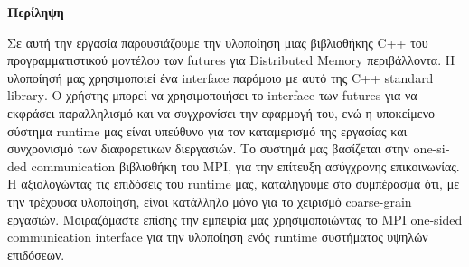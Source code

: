 \thispagestyle{empty}


\begin{titlepage}
\begin{center}

{\bf\Large{Περίληψη}}\\

\end{center}

Σε αυτή την εργασία παρουσιάζουμε την υλοποίηση μιας βιβλιοθήκης \textlatin{C++} του προγραμματιστικού μοντέλου
των futures για \textlatin{Distributed Memory} περιβάλλοντα. Η υλοποίησή μας χρησιμοποιεί ένα interface παρόμοιο 
με αυτό της \textlatin{C++ standard library}. Ο χρήστης μπορεί να χρησιμοποιήσει το
\textlatin{interface} των \textlatin{futures} για να εκφράσει παραλληλισμό και να συγχρονίσει την εφαρμογή του, ενώ η
υποκείμενο σύστημα \textlatin{runtime} μας είναι υπεύθυνο για τον καταμερισμό της εργασίας και συνχρονισμό των 
διαφορετικων διεργασιών. Το συστημά μας βασίζεται στην \textlatin{one-sided communication} βιβλιοθήκη του \textlatin{MPI},
για την επίτευξη ασύγχρονης επικοινωνίας. Η αξιολογώντας τις επιδόσεις του \textlatin{runtime} μας, καταλήγουμε 
στο συμπέρασμα ότι, με την τρέχουσα υλοποίηση, είναι κατάλληλο μόνο για το χειρισμό \textlatin{coarse-grain} εργασιών.
Μοιραζόμαστε επίσης την εμπειρία μας χρησιμοποιώντας το \textlatin{MPI one-sided communication interface} για την υλοποίηση 
ενός \textlatin{runtime} συστήματος υψηλών επιδόσεων.

\vfill

\end{titlepage}

